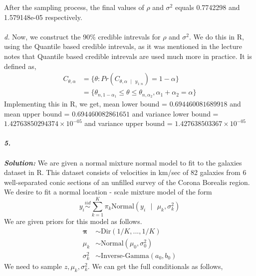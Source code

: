 \documentclass[11pt]{article}
\begin{document}
\noindent After the sampling process, the final values of $\rho$ and $\sigma^2$ equals 0.7742298 and 1.579148e-05 respectively. \\ \\
\emph{d.} Now, we construct the 90\% credible intrevals for $\rho$ and $\sigma^2$. We do this in R, using the Quantile based credible intrevals, as it was mentioned in the lecture notes that Quantile based credible intrevals are used much more in practice. It is defined as,
\begin{equation}
  \nonumber
  \begin{aligned}
    C_{\theta, \alpha} & = \{\theta : Pr(C_{\theta, \alpha \text{ }|\text{ } y_{1:n}}) = 1 - \alpha\}\\
    & = \{\theta_{n, 1 - \alpha_{1}} \leq \theta \leq \theta_{n, \alpha_{2}}, \alpha_{1} + \alpha_{2} = \alpha\}
  \end{aligned}
\end{equation}
Implementing this in R, we get, mean lower bound = $0.694460081689918$ and mean upper bound = $0.694460082861651$ and variance lower bound = $1.42763850294374 \times 10^{-05}$ and variance upper bound = $1.427638503367 \times 10^{-05}$\\ \\
\textbf{\emph{5.}}\\ \\
\textbf{\emph{Solution:}} We are given a normal mixture normal model to fit to the galaxies dataset in R. This dataset consists of velocities in km/sec of 82 galaxies from 6 well-separated conic sections of an unfilled survey of the Corona Borealis region. We desire to fit a normal location - scale mixture model of the form
\begin{equation}
  \nonumber
  y_{i} \overset{iid}{\sim} \sum_{k = 1}^{K} \pi_{k} \text{Normal}(y_{i} \text{ } | \text{ } \mu_{k}, \sigma_{k}^2)
\end{equation}
We are given priors for this model as follows.
\begin{equation}
  \nonumber
  \begin{aligned}
    \bm{\pi} & \sim \text{Dir}(1/K, . . . , 1/K)\\
    \mu_k & \sim \text{Normal}(\mu_0, \sigma_0^2)\\
    \sigma_k^2 & \sim \text{Inverse-Gamma}(a_0, b_0)
  \end{aligned}
\end{equation}
We need to sample $z, \mu_k, \sigma_k^2$. We can get the full conditionals as follows,
\end{document}
